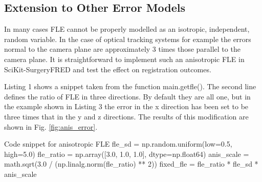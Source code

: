 \subsection{Extension to Other Error Models}
In many cases {FLE} cannot be properly modelled as an isotropic, independent, random variable. In the case of optical tracking systems for example \cite{736031} the errors normal to the camera plane are approximately 3 times those parallel to the camera plane. It is straightforward to implement such an anisotropic \gls{FLE} in SciKit-SurgeryFRED and test the effect on registration outcomes.

Listing 1 shows a snippet taken from the function main.getfle(). The second line defines the ratio of \gls{FLE} in three directions. By default they are all one, but in the example shown in Listing 3 the error in the x direction has been set to be three times that in the y and z directions. The results of this modification are shown in Fig. \ref{fig:anis_error}. 

\begin{pythonlisting}{\label{lis:anis} Code snippet for anisotropic {FLE}}
    fle_sd = np.random.uniform(low=0.5, high=5.0)
    fle_ratio = np.array([3.0, 1.0, 1.0], dtype=np.float64)
    anis_scale = math.sqrt(3.0 / (np.linalg.norm(fle_ratio) ** 2))
    fixed_fle = fle_ratio * fle_sd * anis_scale
\end{pythonlisting}

